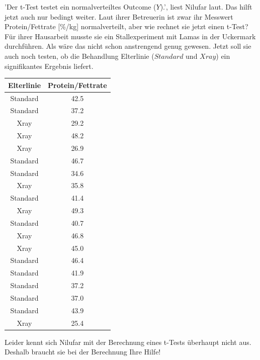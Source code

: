 \documentclass[a4paper, 9pt]{scrartcl}\usepackage[]{graphicx}\usepackage[]{xcolor}
\begin{document}
'Der t-Test testet ein normalverteiltes Outcome ($Y$).', liest Nilufar laut. Das hilft jetzt auch nur bedingt weiter. Laut ihrer Betreuerin ist zwar ihr Messwert Protein/Fettrate [\%/kg] normalverteilt, aber wie rechnet sie jetzt einen t-Test? Für ihrer Hausarbeit musste sie ein Stallexperiment mit Lamas in der Uckermark durchführen. Als wäre das nicht schon anstrengend genug gewesen. Jetzt soll sie auch noch testen, ob die Behandlung Elterlinie ($Standard$ und $Xray$) ein signifikantes Ergebnis liefert.

\begin{table}[!h]
\centering
\begin{tabular}{cc}
\toprule
Elterlinie & Protein/Fettrate\\
\midrule
Standard & 42.5\\
Standard & 37.2\\
Xray & 29.2\\
Xray & 48.2\\
Xray & 26.9\\
\addlinespace
Standard & 46.7\\
Standard & 34.6\\
Xray & 35.8\\
Standard & 41.4\\
Xray & 49.3\\
\addlinespace
Standard & 40.7\\
Xray & 46.8\\
Xray & 45.0\\
Standard & 46.4\\
Standard & 41.9\\
\addlinespace
Standard & 37.2\\
Standard & 37.0\\
Standard & 43.9\\
Xray & 25.4\\
\bottomrule
\end{tabular}
\end{table}



Leider kennt sich Nilufar mit der Berechnung eines t-Tests überhaupt nicht aus. Deshalb braucht sie bei der Berechnung Ihre Hilfe!
\end{document}
